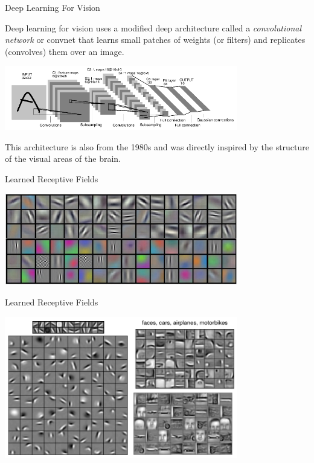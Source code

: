 \documentclass[serif,xcolor=pdftex,dvipsnames,table,hyperref={bookmarks=false}]{beamer}
\begin{document}
\begin{frame}[t]{Deep Learning For Vision}

Deep learning for vision uses a modified deep architecture called a \textit{convolutional network} or convnet that learns small patches of weights (or filters)
and replicates (convolves) them over an image. 

{\center
\includegraphics[width=4in]{../Figures/convnet.png}
\vspace{1em}
}

\pause This architecture is also from the 1980s and was 
directly inspired by the structure of the visual areas of the brain.

\end{frame}


\begin{frame}[t]{Learned Receptive Fields}

\center
\includegraphics[width=4in]{../Figures/nn_filters.jpg}

\end{frame}

\begin{frame}[t]{Learned Receptive Fields}

\center
\includegraphics[width=4in]{../Figures/rbm_filters.png}

\end{frame}
\end{document}
